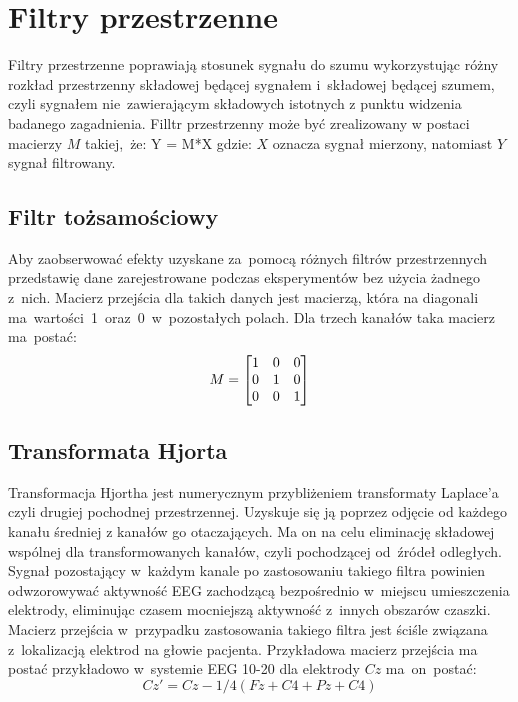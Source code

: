 \documentclass[licencjacka,openright]{pracamgr}
\begin{document}
\section{Filtry przestrzenne}
Filtry przestrzenne poprawiają stosunek sygnału do szumu wykorzystując różny rozkład przestrzenny składowej będącej sygnałem i~składowej będącej szumem, czyli sygnałem nie~zawierającym składowych istotnych z punktu widzenia badanego zagadnienia.
Filltr przestrzenny może być zrealizowany w postaci macierzy $M$ takiej,~że: 
Y = M*X
gdzie: $X$ oznacza sygnał mierzony, natomiast $Y$ sygnał filtrowany.


\subsection{Filtr tożsamościowy}
Aby zaobserwować efekty uzyskane za~pomocą różnych filtrów przestrzennych przedstawię dane zarejestrowane podczas eksperymentów bez użycia żadnego z~nich. Macierz przejścia dla takich danych jest macierzą, która na diagonali ma~wartości~1~oraz~0~w~pozostałych polach.
Dla trzech kanałów taka macierz ma~postać:
\[
M =
\begin{bmatrix}
  $1$ & $0$ & $0$ \\
  $0$ & $1$ & $0$ \\
  $0$ & $0$ & $1$ 
\end{bmatrix}
\]

\subsection{Transformata Hjorta}
Transformacja Hjortha jest numerycznym przybliżeniem transformaty Laplace'a czyli drugiej pochodnej przestrzennej. Uzyskuje się ją poprzez odjęcie od każdego kanału średniej z kanałów go otaczających. Ma on na celu eliminację składowej wspólnej dla transformowanych kanałów, czyli pochodzącej od~źródeł odległych. Sygnał pozostający w~każdym kanale po zastosowaniu takiego filtra powinien odwzorowywać aktywność EEG zachodzącą bezpośrednio w~miejscu umieszczenia elektrody, eliminując czasem mocniejszą aktywność z~innych obszarów czaszki.
Macierz przejścia w~przypadku zastosowania takiego filtra jest ściśle związana z~lokalizacją elektrod na głowie pacjenta.
Przykładowa macierz przejścia ma postać przykładowo w~systemie EEG 10-20 dla elektrody $Cz$ ma~on~postać:
\begin{equation}
Cz' = Cz - 1/4(Fz+C4+Pz+C4)
\end{equation}
\end{document}
